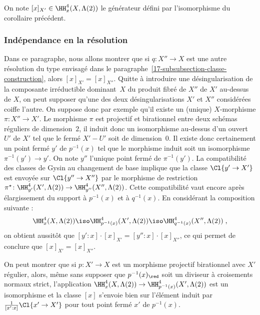\documentclass[10pt]{../fichiers-configuration-latex/smfart}
\begin{document}
\begin{definition3}
On note $[x]_{X'}\in \HH^4_x(X,\Lambda(2))$ le générateur défini par
l'isomorphisme du corollaire précédent.
\end{definition3}

\subsubsection{Indépendance en la résolution}%
\label{17-subsubsection-classe-independance}

Dans ce paragraphe, nous allons montrer que si $q\colon X''\to X$ est une
autre résolution du type envisagé dans le
paragraphe~\ref{17-subsubsection-classe-construction}, alors
$[x]_{X'}=[x]_{X''}$. Quitte à introduire une désingularisation de la
composante irréductible dominant $X$ du produit
fibré de $X''$ de $X'$ au-dessus de $X$, on peut supposer qu'une des deux
désingularisations $X'$ et $X''$ considérées coiffe l'autre. On suppose
donc par exemple qu'il existe un (unique) $X$-morphisme $\pi\colon X''\to
X'$. Le morphisme $\pi$ est projectif et birationnel entre deux schémas
réguliers de dimension $2$, il induit donc un isomorphisme au-dessus d'un
ouvert $U'$ de $X'$ tel que le fermé $X'-U'$ soit de dimension $0$. Il
existe donc certainement un point fermé $y'$ de $p^{-1}(x)$ tel que le
morphisme induit soit un isomorphisme $\pi^{-1}(y')\to y'$. On note $y''$
l'unique point fermé de $\pi^{-1}(y')$. La compatibilité des classes de
Gysin au changement de base implique que la classe $\Cl{y'\to X'}$ est
envoyée sur $\Cl{y''\to X''}$ par le morphisme de restriction
$\pi^\star\colon \HH^4_{y'}(X',\Lambda(2))\to \HH^4_{y''}(X'',\Lambda(2))$.
Cette compatibilité vaut encore après élargissement du support à
$p^{-1}(x)$ et à $q^{-1}(x)$. En considérant la composition suivante :
\[\HH^4_{x}(X,\Lambda(2))\iso \HH^4_{p^{-1}(x)}(X',\Lambda(2))\iso
\HH^4_{q^{-1}(x)}(X'',\Lambda(2))\;\text{,} \]
on obtient aussitôt que $[y':x]\cdot [x]_{X'}=[y'':x]\cdot [x]_{X''}$, ce
qui permet de conclure que $[x]_{X'}=[x]_{X''}$.

\begin{remarque3}
On peut montrer que si $p\colon X'\to X$ est un morphisme projectif
birationnel avec $X'$ régulier, alors, même sans supposer que
$p^{-1}(x)_\red$ soit un diviseur à croisements normaux strict, 
l'application $\HH^4_x(X,\Lambda(2))\to
\HH^4_{p^{-1}(x)}(X',\Lambda(2))$ est un isomorphisme et la classe $[x]$
s'envoie bien sur l'élément induit par 
$\frac 1 {[x':x]}\Cl{x'\to X'}$ pour tout
point fermé $x'$ de $p^{-1}(x)$.
\end{remarque3}
\end{document}
